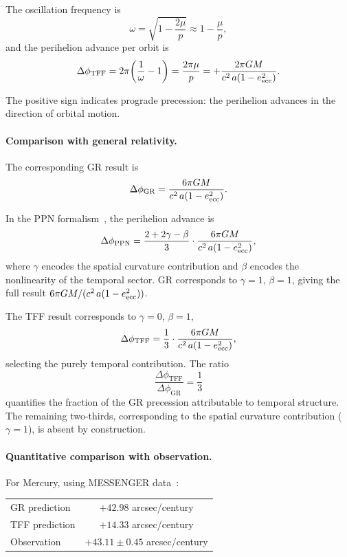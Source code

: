 \documentclass[12pt]{article}
\begin{document}
The oscillation frequency is
$$
\omega = \sqrt{1 - \frac{2\mu}{p}} \approx 1 - \frac{\mu}{p} ,
$$
and the perihelion advance per orbit is
\begin{equation}
\Delta\phi_{\text{TFF}}
= 2\pi\!\left(\frac{1}{\omega} - 1\right)
= \frac{2\pi\mu}{p}
= +\frac{2\pi GM}{c^2\, a(1-e_{\rm ecc}^2)} .
\label{eq:precession_tff}
\end{equation}

The positive sign indicates prograde precession: the perihelion advances in the direction of orbital motion.

\paragraph{Comparison with general relativity.}
The corresponding GR result is
\begin{equation}
\Delta\phi_{\text{GR}}
= \frac{6\pi GM}{c^2\, a(1-e_{\rm ecc}^2)} .
\end{equation}

In the PPN formalism~\cite{Will2014}, the perihelion advance is
\begin{equation}
\Delta\phi_{\text{PPN}}
= \frac{2 + 2\gamma - \beta}{3}
  \cdot\frac{6\pi GM}{c^2\,a(1-e_{\rm ecc}^2)} ,
\end{equation}
where $\gamma$ encodes the spatial curvature contribution and $\beta$ encodes the nonlinearity of the temporal sector. GR corresponds to $\gamma = 1$, $\beta = 1$, giving the full result $6\pi GM/(c^2\,a(1-e_{\rm ecc}^2))$.

The TFF result corresponds to $\gamma = 0$, $\beta = 1$,
$$
\Delta\phi_{\text{TFF}}
= \frac{1}{3}
  \cdot\frac{6\pi GM}{c^2\,a(1-e_{\rm ecc}^2)} ,
$$
selecting the purely temporal contribution. The ratio
\begin{equation}
\frac{\Delta\phi_{\text{TFF}}}{\Delta\phi_{\text{GR}}} = \frac{1}{3}
\end{equation}
quantifies the fraction of the GR precession attributable to temporal structure. The remaining two-thirds, corresponding to the spatial curvature contribution ($\gamma = 1$), is absent by construction.

\paragraph{Quantitative comparison with observation.}
For Mercury, using MESSENGER data~\cite{Park2017}:
\begin{center}
\begin{tabular}{lc}
\hline
GR prediction & $+42.98$ arcsec/century \\
TFF prediction & $+14.33$ arcsec/century \\
Observation & $+43.11 \pm 0.45$ arcsec/century \\
\hline
\end{tabular}
\end{center}
\end{document}
